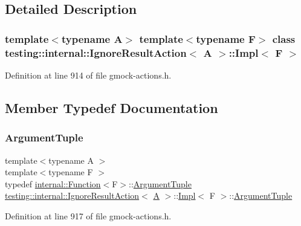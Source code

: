 \subsection{Detailed Description}
\subsubsection*{template$<$typename A$>$\newline
template$<$typename F$>$\newline
class testing\+::internal\+::\+Ignore\+Result\+Action$<$ A $>$\+::\+Impl$<$ F $>$}



Definition at line 914 of file gmock-\/actions.\+h.



\subsection{Member Typedef Documentation}
\mbox{\label{classtesting_1_1internal_1_1IgnoreResultAction_1_1Impl_a1e3be49f0be40b497a57fc462ed3fa23}} 
\subsubsection{\texorpdfstring{Argument\+Tuple}{ArgumentTuple}}
{\footnotesize\ttfamily template$<$typename A $>$ \\
template$<$typename F $>$ \\
typedef \hyperlink{structtesting_1_1internal_1_1Function}{internal\+::\+Function}$<$F$>$\+::\hyperlink{classtesting_1_1ActionInterface_af72720d864da4d606629e83edc003511}{Argument\+Tuple} \hyperlink{classtesting_1_1internal_1_1IgnoreResultAction}{testing\+::internal\+::\+Ignore\+Result\+Action}$<$ \hyperlink{namespacetesting_a5e9134d655d2fc9323902348083282e7}{A} $>$\+::\hyperlink{classtesting_1_1internal_1_1IgnoreResultAction_1_1Impl}{Impl}$<$ F $>$\+::\hyperlink{classtesting_1_1ActionInterface_af72720d864da4d606629e83edc003511}{Argument\+Tuple}}



Definition at line 917 of file gmock-\/actions.\+h.

